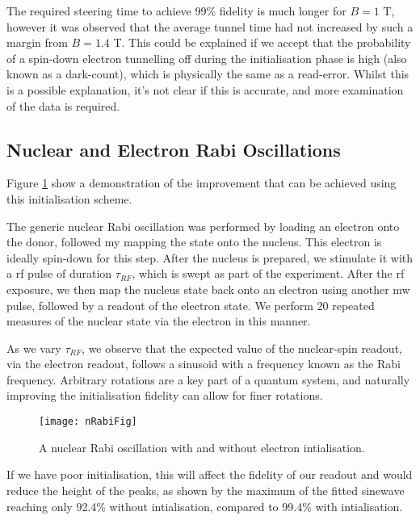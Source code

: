 	The required steering time to achieve 99\% fidelity is much longer for $B = 1$ T, however it was observed that the average tunnel time had not increased by such a margin from $B = 1.4$ T. This could be explained if we accept that the probability of a spin-down electron tunnelling off during the initialisation phase is high (also known as a dark-count), which is physically the same as a read-error. Whilst this is a possible explanation, it's not clear if this is accurate, and more examination of the data is required.

\subsection{Nuclear and Electron Rabi Oscillations}
	Figure \ref{fig::nuclear_rabi} show a demonstration of the improvement that can be achieved using this initialisation scheme.
	
	The generic nuclear Rabi oscillation was performed by loading an electron onto the donor, followed my mapping the state onto the nucleus. This electron is ideally spin-down for this step. After the nucleus is prepared, we stimulate it with a \gls{rf} pulse of duration $\tau_{RF}$, which is swept as part of the experiment. After the \gls{rf} exposure, we then map the nucleus state back onto an electron using another \gls{mw} pulse, followed by a readout of the electron state. We perform 20 repeated measures of the nuclear state via the electron in this manner.
	
	As we vary $\tau_{RF}$, we observe that the expected value of the nuclear-spin readout, via the electron readout, follows a sinusoid with a frequency known as the Rabi frequency. Arbitrary rotations are a key part of a quantum system, and naturally improving the initialisation fidelity can allow for finer rotations.
	
	\begin{figure}[H]
		\centering
		\texttt{[image: nRabiFig]}
		\caption{A nuclear Rabi oscillation with and without electron intialisation.}
		\label{fig::nuclear_rabi}
	\end{figure}
	
	If we have poor initialisation, this will affect the fidelity of our readout and would reduce the height of the peaks, as shown by the maximum of the fitted sinewave reaching only 92.4\% without intialisation, compared to 99.4\% with intialisation.

